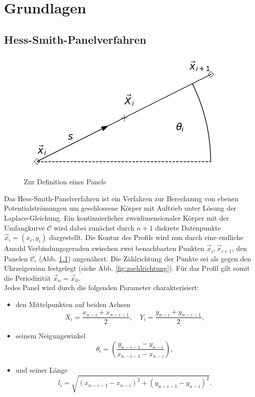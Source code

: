 \chapter{Grundlagen}
\label{chap:hess-smith}


\section{Hess-Smith-Panelverfahren}
\begin{figure}[!h]
\begin{center} \includegraphics[scale=0.5]{figures/panel.png} \end{center}
\caption{Zur Definition eines Panels}
\label{fig:panel}
\end{figure}
Das Hess-Smith-Panelverfahren ist ein Verfahren zur Berechnung von ebenen Potentialströmungen um geschlossene Körper mit Auftrieb unter Lösung der Laplace-Gleichung. Ein kontinuierlicher zweidimensionaler Körper mit der Umfangkurve $\mathcal{C}$ wird dabei zunächst durch  $n + 1$ diskrete Datenpunkte $\vec x_i = (x_i, y_i)$ dargestellt. Die Kontur des Profils wird nun durch eine endliche Anzahl Verbindungsgeraden zwischen zwei benachbarten Punkten $\vec x_i, \vec x_{i+1}$, den Panelen $\mathcal{C}_i$ (Abb. \ref{fig:panel}) angenähert. Die Zählrichtung der Punkte sei als gegen den Uhrzeigersinn festgelegt (siehe Abb. \ref{fig:zaehlrichtung}). Für das Profil gilt somit die Periodizität $\vec x_n = \vec x_0$. \\
Jedes Panel wird durch die folgenden Parameter charakterisiert:
\begin{itemize}
\item den Mittelpunkten auf beiden Achsen
\begin{equation}
\label{eq:X}
X_i =  \frac{x_{n-i}+x_{n-i-1}}{2}, \quad Y_i =  \frac{y_{n-i}+y_{n-i-1}}{2},
\end{equation}
\item seinem Neigungswinkel
\begin{equation}
\theta_i =  \left( \frac{y_{n-i-1} - y_{n-i}}{x_{n-i-1} - x_{n-i}} \right),
\end{equation}
\item und seiner Länge
\begin{equation}
\label{eq:l}
l_i =  \sqrt{(x_{n-i-1} - x_{n-i})^2 + (y_{n-i-1} - y_{n-i})^2}.
\end{equation}
\end{itemize}



